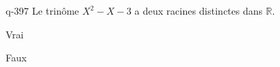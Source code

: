 \begin{truefalse}{q-397}
Le trinôme $X^2-X-3$ a deux racines distinctes dans $\mathbb R$.
\item* Vrai
\item Faux
\end{truefalse}

